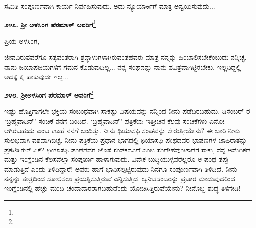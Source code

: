 ಸಮಿತಿ ಸಂಪೂರ್ಣವಾಗಿ ಕಾರ್ಯ ನಿರ್ವಹಿಸುವುದು. ಅದು ನ್ಯೂಯಾರ್ಕಿಗೆ ಮಾತ್ರ ಅನ್ವಯಿಸುವುದು...
\vspace{-0.6cm}

{\flushright
{\fontsize{11.5pt}{11pt}\selectfont{ಪ್ರೀತಿ ಆಶೀರ್ವಾದಗಳೊಡನೆ ಅನವರತವೂ ನಿನ್ನ\\[-0.2pt] ವಿವೇಕಾನಂದ}}\par}
\vspace{-0.5cm}

\begin{center}
\textbf{೨೪೭. ಶ‍್ರೀ ಅಳಸಿಂಗ ಪೆರಮಾಳ್ ಅವರಿಗೆ}\footnote{}
\end{center}

\vspace{-0.7cm}

\begin{flushright}
{\fontsize{11.5pt}{11pt}\selectfont{ಯು.ಎಸ್.ಎ.\\[-0.2pt] ೨೩ನೇ ಜನವರಿ, ೧೮೯೬}}
\end{flushright}
\vspace{-0.5cm}

\noindent
ಪ್ರಿಯ ಅಳಸಿಂಗ,

ಜೀವವಿರುವವರೆಗೂ ಸತ್ಯವಂತರಾಗಿ ಶ್ರದ್ಧಾಳುಗಳಾಗಿರುವಂತಹವರು ಮಾತ್ರ ನನ್ನನ್ನು ಹಿಂಬಾಲಿಸಬೇಕೆಂಬುದು ನನ್ನಿಚ್ಛೆ. ನಾನು ಜಯಾಪಜಯಗಳಿಗೆ ಗಮನ ಕೊಡುವುದಿಲ್ಲ... ನನ್ನ ಸಂಘವನ್ನು ನಾನು ಪವಿತ್ರವಾಗಿಟ್ಟಿರಬೇಕು. ಇಲ್ಲದಿದ್ದಲ್ಲಿ ಅದಕ್ಕೆ ಕೈ ಹಾಕುವುದೇ ಇಲ್ಲ...

\vspace{-0.6cm}

{\flushright
{\fontsize{11.5pt}{11pt}\selectfont{ನಿನ್ನ\\[-0.2pt] ವಿವೇಕಾನಂದ}}\par}

\begin{center}
\textbf{೨೪೮. ಶ‍್ರೀಅಳಸಿಂಗ ಪೆರಮಾಳ್ ಅವರಿಗೆ}\footnote{}
\end{center}

\vspace{-0.5cm}

\begin{flushright}
{\fontsize{11.5pt}{11pt}\selectfont{೨೩ ನೇ ಜನವರಿ, ೧೮೯೬}}
\end{flushright}

ಇಷ್ಟು ಹೊತ್ತಿಗಾಗಲೇ ಭಕ್ತಿಯ ಸಂಬಂಧವಾಗಿ ಸಾಕಷ್ಟು ವಿಷಯವನ್ನು ನನ್ನಿಂದ ನೀನು ಪಡೆದಿರಬಹುದು. ಡಿಸೆಂಬರ್  ರ ‘ಬ್ರಹ್ಮವಾದಿನ್’ ಸಂಚಿಕೆ ನನಗೆ ಬಂದಿದೆ. ‘ಬ್ರಹ್ಮವಾದಿನ್’ ಪತ್ರಿಕೆಯ ಇತ್ತೀಚಿನ ಕೆಲವು ಸಂಚಿಕೆಗಳು ಏನೋ ಆಗಿರಬಹುದು ಎಂಬ ಊಹೆ ನನಗೆ ಬಂದಿತ್ತು. ನೀನು ಥಿಯಾಸಫಿ ಸಂಘವನ್ನು ಸೇರುತ್ತೀಯೇನು? ಈ ಬಾರಿ ನೀನು ಸುಲಭವಾಗಿ ವಶವಾಗಿಬಿಟ್ಟೆ. ನೀನು ಪತ್ರಿಕೆಯ ಪ್ರಧಾನ ಭಾಗದಲ್ಲಿ ಥಿಯಾಸಫಿ ಪಂಥದವರ ಭಾಷಣಗಳ ಜಾಹಿರಾತನ್ನು ಪ್ರಕಟಿಸಿರುವೆ ಏಕೆ? ಥಿಯಾಸಫಿ ಪಂಥದವರ ಜೊತೆ ಸಂಪರ್ಕವಿದೆ ಎಂಬ ಸಂದೇಹವುಂಟಾದರೆ ಸಾಕು, ನನ್ನ ಅಮೆರಿಕದ ಮತ್ತು ಇಂಗ್ಲೆಂಡಿನ ಕೆಲಸವೆಲ್ಲಾ ಸಂಪೂರ್ಣ ಹಾಳಾಗುವುದು. ವಿವೇಕ ಬುದ್ಧಿಯುಳ್ಳವರೆಲ್ಲರೂ ಆ ಪಂಥ ತಪ್ಪು ಮಾಡುತ್ತಿದೆ ಎಂದು ತಿಳಿದಿದ್ದಾರೆ! ಅವರು ಹಾಗೆ ಭಾವಿಸಲ್ಪಟ್ಟಿರುವುದು ನಿನಗೂ ಸಂಪೂರ್ಣವಾಗಿ ತಿಳಿದಿದೆ. ನೀನು ನನ್ನನ್ನು ತಂತ್ರದಿಂದ ಸೋಲಿಸಲು ಪ್ರಯತ್ನಿಸುತ್ತಿರುವೆ ಎನ್ನಿಸುತ್ತಿದೆ. ಆ್ಯನಿಬೆಸೆಂಟರನ್ನು ಪ್ರಚಾರ ಮಾಡುವುದರಿಂದ ಇಂಗ್ಲೆಂಡಿನಲ್ಲಿ ಹೆಚ್ಚು ಮಂದಿ ಚಂದಾದಾರರಾಗಬಹುದೆಂದು ಯೋಚಿಸಿತ್ತಿರುವೆಯೇನು? ನೀನೊಬ್ಬ ಶುದ್ಧ ತಿಳಿಗೇಡಿ!

